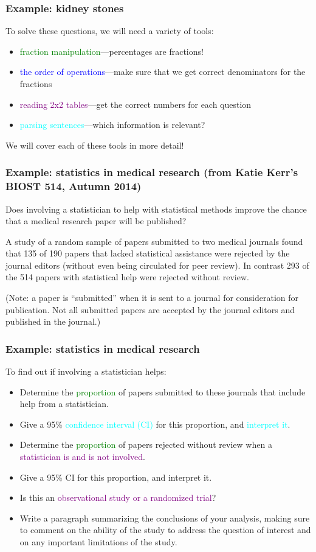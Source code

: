 \documentclass[11pt]{beamer}
\newcommand{\myframe}[1]{\begin{frame} \frametitle{#1}}
\newenvironment{spaceitemize}
{ \begin{itemize}
    \setlength{\itemsep}{10pt}
    \setlength{\parskip}{0pt}
    \setlength{\parsep}{0pt}     }
{ \end{itemize}                  }
\begin{document}
\myframe{Example: kidney stones}
To solve these questions, we will need a variety of tools: 
\begin{spaceitemize}
\item \textcolor{green}{fraction manipulation}---percentages are fractions! 
\item \textcolor{blue}{the order of operations}---make sure that we get correct denominators for the fractions
\item \textcolor{purple}{reading 2x2 tables}---get the correct numbers for each question
\item \textcolor{cyan}{parsing sentences}---which information is relevant?
\end{spaceitemize}

We will cover each of these tools in more detail!
\end{frame}

\myframe{Example: statistics in medical research \small (from Katie Kerr's BIOST 514, Autumn 2014)}
Does involving a statistician to help with statistical methods improve the chance that a medical research paper will be published?  

A study of a random sample of papers submitted to two medical journals found that 135 of 190 papers that lacked statistical assistance were rejected by the journal editors (without even being circulated for peer review).  In contrast 293 of the 514 papers with statistical help were rejected without review.  

(Note:  a paper is ``submitted'' when it is sent to a journal for consideration for publication.  Not all submitted papers are accepted by the journal editors and published in the journal.)

\end{frame}

\myframe{Example: statistics in medical research}
To find out if involving a statistician helps:
\begin{spaceitemize}
\item Determine the \textcolor{green}{proportion} of papers submitted to these journals that include help from a statistician.
\item Give a 95\% \textcolor{cyan}{confidence interval (CI)} for this proportion, and \textcolor{cyan}{interpret it}.
\item Determine the \textcolor{green}{proportion} of papers rejected without review when a \textcolor{purple}{statistician is and is not involved}.
\item Give a 95\% CI for this proportion, and interpret it.
\item Is this an \textcolor{purple}{observational study or a randomized trial}?
\item Write a paragraph summarizing the conclusions of your analysis, making sure to comment on the ability of the study to address the question of interest and on any important limitations of the study.
\end{spaceitemize}
\end{frame}
\end{document}

